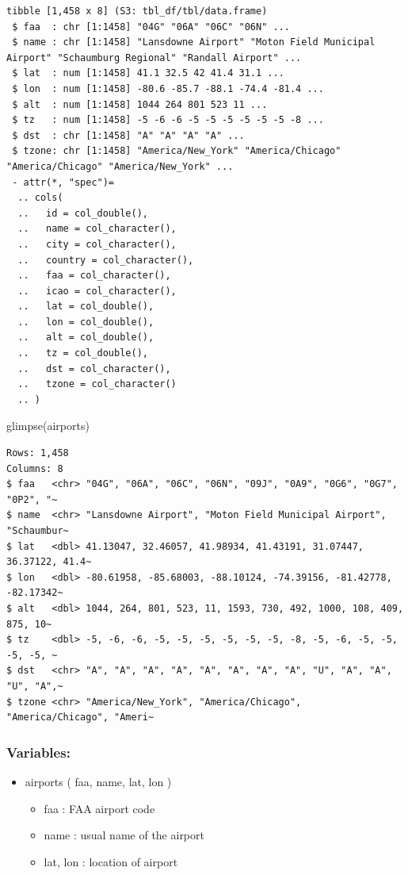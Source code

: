 \documentclass[
  10pt,
  letterpaper,
  DIV=11,
  numbers=noendperiod]{scrartcl}
\newenvironment{Shaded}{\begin{snugshade}}{\end{snugshade}}
\newcommand{\FunctionTok}[1]{\textcolor[rgb]{0.28,0.35,0.67}{#1}}
\newcommand{\NormalTok}[1]{\textcolor[rgb]{0.00,0.23,0.31}{#1}}
\providecommand{\tightlist}{%
  \setlength{\itemsep}{0pt}\setlength{\parskip}{0pt}}\usepackage{longtable,booktabs,array}
\begin{document}
\begin{verbatim}
tibble [1,458 x 8] (S3: tbl_df/tbl/data.frame)
 $ faa  : chr [1:1458] "04G" "06A" "06C" "06N" ...
 $ name : chr [1:1458] "Lansdowne Airport" "Moton Field Municipal Airport" "Schaumburg Regional" "Randall Airport" ...
 $ lat  : num [1:1458] 41.1 32.5 42 41.4 31.1 ...
 $ lon  : num [1:1458] -80.6 -85.7 -88.1 -74.4 -81.4 ...
 $ alt  : num [1:1458] 1044 264 801 523 11 ...
 $ tz   : num [1:1458] -5 -6 -6 -5 -5 -5 -5 -5 -5 -8 ...
 $ dst  : chr [1:1458] "A" "A" "A" "A" ...
 $ tzone: chr [1:1458] "America/New_York" "America/Chicago" "America/Chicago" "America/New_York" ...
 - attr(*, "spec")=
  .. cols(
  ..   id = col_double(),
  ..   name = col_character(),
  ..   city = col_character(),
  ..   country = col_character(),
  ..   faa = col_character(),
  ..   icao = col_character(),
  ..   lat = col_double(),
  ..   lon = col_double(),
  ..   alt = col_double(),
  ..   tz = col_double(),
  ..   dst = col_character(),
  ..   tzone = col_character()
  .. )
\end{verbatim}

\begin{Shaded}
\begin{Highlighting}[numbers=left,,]
\FunctionTok{glimpse}\NormalTok{(airports)}
\end{Highlighting}
\end{Shaded}

\begin{verbatim}
Rows: 1,458
Columns: 8
$ faa   <chr> "04G", "06A", "06C", "06N", "09J", "0A9", "0G6", "0G7", "0P2", "~
$ name  <chr> "Lansdowne Airport", "Moton Field Municipal Airport", "Schaumbur~
$ lat   <dbl> 41.13047, 32.46057, 41.98934, 41.43191, 31.07447, 36.37122, 41.4~
$ lon   <dbl> -80.61958, -85.68003, -88.10124, -74.39156, -81.42778, -82.17342~
$ alt   <dbl> 1044, 264, 801, 523, 11, 1593, 730, 492, 1000, 108, 409, 875, 10~
$ tz    <dbl> -5, -6, -6, -5, -5, -5, -5, -5, -5, -8, -5, -6, -5, -5, -5, -5, ~
$ dst   <chr> "A", "A", "A", "A", "A", "A", "A", "A", "U", "A", "A", "U", "A",~
$ tzone <chr> "America/New_York", "America/Chicago", "America/Chicago", "Ameri~
\end{verbatim}

\subsubsection{Variables:}\label{variables-2}

\begin{itemize}
\tightlist
\item
  airports ( faa, name, lat, lon )

  \begin{itemize}
  \tightlist
  \item
    faa : FAA airport code
  \item
    name : usual name of the airport
  \item
    lat, lon : location of airport
  \end{itemize}
\end{itemize}
\end{document}
